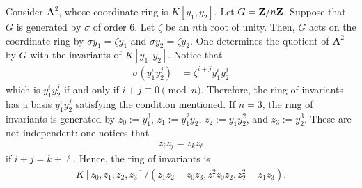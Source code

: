 \documentclass [11 pt, oneside] {article}
\begin{document}
\begin{example}\label{}
Consider $\mathbf{A}^2$, whose coordinate ring is $K[y_1,y_2]$. Let $G=\mathbf Z / n\mathbf Z$. Suppose that $G$ is generated by $\sigma$ of order $6$. Let $\zeta$ be an $n$th root of unity. Then, $G$ acts on the coordinate ring by $\sigma y_1 = \zeta y_1$ and $\sigma y_2= \zeta y_2$. One determines the quotient of $\mathbf{A}^2$ by $G$ with the invariants of $K[y_1,y_2]$. Notice that 
\begin{align*}
	\sigma(y_1^iy_2^j) &= \zeta^{i+j} y_1^iy_2^j
\end{align*}
which is $y_1^iy_2^j$ if and only if $i+j\equiv 0\pmod n$. Therefore, the ring of invariants has a basis $y_1^iy_2^j$ satisfying the condition mentioned. If $n=3$, the ring of invariants is generated by $z_0:=y_1^3$, $z_1:=y_1^2y_2$, $z_2:=y_1y_2^2$, and $z_3:=y_2^3$. These are not independent: one notices that
\begin{align*}
	z_iz_j = z_kz_\ell
\end{align*}
if $i+j=k+\ell$. Hence, the ring of invariants is
\begin{align*}
	K[z_0,z_1,z_2,z_3] / (z_1z_2-z_0z_3, z_1^2 z_0z_2, z_2^2-z_1z_3). 
\end{align*}
\end{example}
\end{document}
